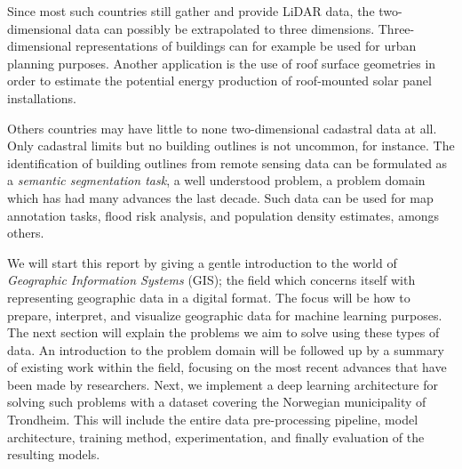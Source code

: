Since most such countries still gather and provide LiDAR data, the two-dimensional data can possibly be extrapolated to three dimensions.
Three-dimensional representations of buildings can for example be used for urban planning purposes.
Another application is the use of roof surface geometries in order to estimate the potential energy production of roof-mounted solar panel installations.

Others countries may have little to none two-dimensional cadastral data at all.
Only cadastral limits but no building outlines is not uncommon, for instance.
The identification of building outlines from remote sensing data can be formulated as a \textit{semantic segmentation task}, a well understood problem, a problem domain which has had many advances the last decade.
Such data can be used for map annotation tasks, flood risk analysis, and population density estimates, amongs others.

We will start this report by giving a gentle introduction to the world of \textit{Geographic Information Systems} (GIS); the field which concerns itself with representing geographic data in a digital format.
The focus will be how to prepare, interpret, and visualize geographic data for machine learning purposes.
The next section will explain the problems we aim to solve using these types of data.
An introduction to the problem domain will be followed up by a summary of existing work within the field, focusing on the most recent advances that have been made by researchers.
Next, we implement a deep learning architecture for solving such problems with a dataset covering the Norwegian municipality of Trondheim.
This will include the entire data pre-processing pipeline, model architecture, training method, experimentation, and finally evaluation of the resulting models.
